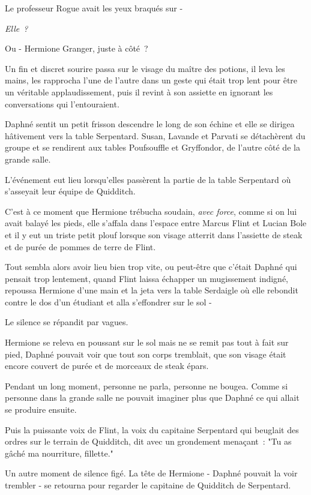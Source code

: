 Le professeur Rogue avait les yeux braqués sur -

\emph{Elle~?}

Ou - Hermione Granger, juste à côté~?

Un fin et discret sourire passa sur le visage du maître des potions, il leva les mains, les rapprocha l'une de l'autre dans un geste qui était trop lent pour être un véritable applaudissement, puis il revint à son assiette en ignorant les conversations qui l'entouraient.

Daphné sentit un petit frisson descendre le long de son échine et elle se dirigea hâtivement vers la table Serpentard. Susan, Lavande et Parvati se détachèrent du groupe et se rendirent aux tables Poufsouffle et Gryffondor, de l'autre côté de la grande salle.

L'événement eut lieu lorsqu'elles passèrent la partie de la table Serpentard où s'asseyait leur équipe de Quidditch.

C'est à ce moment que Hermione trébucha soudain, \emph{avec force}, comme si on lui avait balayé les pieds, elle s'affala dans l'espace entre Marcus Flint et Lucian Bole et il y eut un triste petit plouf lorsque son visage atterrit dans l'assiette de steak et de purée de pommes de terre de Flint.

Tout sembla alors avoir lieu bien trop vite, ou peut-être que c'était Daphné qui pensait trop lentement, quand Flint laissa échapper un mugissement indigné, repoussa Hermione d'une main et la jeta vers la table Serdaigle où elle rebondit contre le dos d'un étudiant et alla s'effondrer sur le sol -

Le silence se répandit par vagues.

Hermione se releva en poussant sur le sol mais ne se remit pas tout à fait sur pied, Daphné pouvait voir que tout son corps tremblait, que son visage était encore couvert de purée et de morceaux de steak épars.

Pendant un long moment, personne ne parla, personne ne bougea. Comme si personne dans la grande salle ne pouvait imaginer plus que Daphné ce qui allait se produire ensuite.

Puis la puissante voix de Flint, la voix du capitaine Serpentard qui beuglait des ordres sur le terrain de Quidditch, dit avec un grondement menaçant~: "Tu as gâché ma nourriture, fillette."

Un autre moment de silence figé. La tête de Hermione - Daphné pouvait la voir trembler - se retourna pour regarder le capitaine de Quidditch de Serpentard.


